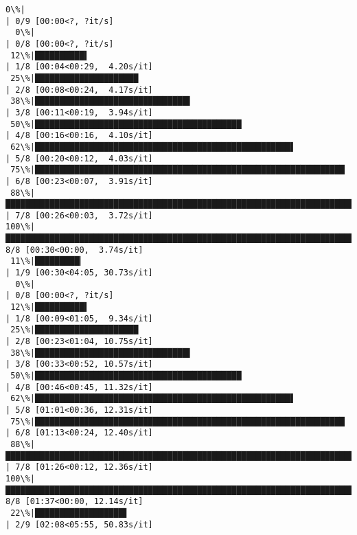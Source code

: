 \documentclass[11pt]{article}
\begin{document}
    \begin{Verbatim}[commandchars=\\\{\}]
  0\%|                                                                                            | 0/9 [00:00<?, ?it/s]
  0\%|                                                                                            | 0/8 [00:00<?, ?it/s]
 12\%|██████████▌                                                                         | 1/8 [00:04<00:29,  4.20s/it]
 25\%|█████████████████████                                                               | 2/8 [00:08<00:24,  4.17s/it]
 38\%|███████████████████████████████▌                                                    | 3/8 [00:11<00:19,  3.94s/it]
 50\%|██████████████████████████████████████████                                          | 4/8 [00:16<00:16,  4.10s/it]
 62\%|████████████████████████████████████████████████████▌                               | 5/8 [00:20<00:12,  4.03s/it]
 75\%|███████████████████████████████████████████████████████████████                     | 6/8 [00:23<00:07,  3.91s/it]
 88\%|█████████████████████████████████████████████████████████████████████████▌          | 7/8 [00:26<00:03,  3.72s/it]
100\%|████████████████████████████████████████████████████████████████████████████████████| 8/8 [00:30<00:00,  3.74s/it]
 11\%|█████████▎                                                                          | 1/9 [00:30<04:05, 30.73s/it]
  0\%|                                                                                            | 0/8 [00:00<?, ?it/s]
 12\%|██████████▌                                                                         | 1/8 [00:09<01:05,  9.34s/it]
 25\%|█████████████████████                                                               | 2/8 [00:23<01:04, 10.75s/it]
 38\%|███████████████████████████████▌                                                    | 3/8 [00:33<00:52, 10.57s/it]
 50\%|██████████████████████████████████████████                                          | 4/8 [00:46<00:45, 11.32s/it]
 62\%|████████████████████████████████████████████████████▌                               | 5/8 [01:01<00:36, 12.31s/it]
 75\%|███████████████████████████████████████████████████████████████                     | 6/8 [01:13<00:24, 12.40s/it]
 88\%|█████████████████████████████████████████████████████████████████████████▌          | 7/8 [01:26<00:12, 12.36s/it]
100\%|████████████████████████████████████████████████████████████████████████████████████| 8/8 [01:37<00:00, 12.14s/it]
 22\%|██████████████████▋                                                                 | 2/9 [02:08<05:55, 50.83s/it]

\end{Verbatim}
\end{document}
